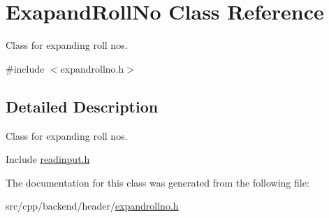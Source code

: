 \hypertarget{classExapandRollNo}{\section{Exapand\-Roll\-No Class Reference}
\label{classExapandRollNo}
}


Class for expanding roll nos.  




{\ttfamily \#include $<$expandrollno.\-h$>$}



\subsection{Detailed Description}
Class for expanding roll nos. 

Include \hyperlink{readinput_8h}{readinput.\-h} 

The documentation for this class was generated from the following file\-:\begin{DoxyCompactItemize}
\item 
src/cpp/backend/header/\hyperlink{expandrollno_8h}{expandrollno.\-h}\end{DoxyCompactItemize}
